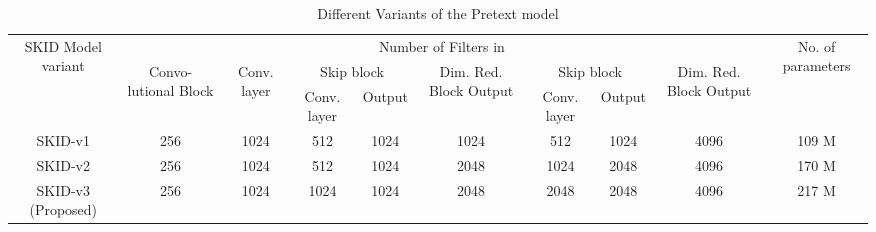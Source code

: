\documentclass[journal]{IEEEtai}
\begin{document}
\begin{table*}[!h]
    \centering
    \bgroup
    \caption{Different Variants of the Pretext model}
    \def\arraystretch{1.5}
    \begin{tabular}{c|c|c|c|c|c|c|c|c|c}
    \hline
       \multirow{4}{1.5cm}{\centering SKID Model variant} &
       \multicolumn{8}{c|}{Number of Filters in} &
       \multirow{4}{1.5cm}{\centering No. of parameters}\\ \cline{2-9}
       
       {} &
       \multirow{3}{*}{\parbox{1.1cm}{\centering Convo- lutional Block}} &
       \multirow{3}{0.8cm}{\centering  Conv. layer} &
       \multicolumn{2}{c|}{\centering  Skip block} &
       \multirow{3}{1.4cm}{\centering  Dim. Red. Block Output} &
       \multicolumn{2}{c|}{ Skip block} &
       \multirow{3}{1.4cm}{\centering  Dim. Red. Block Output} &
       {}\\ \cline{4-5} \cline{7-8}
       
       {} &
       {} &
       {} &
       \multirow{2}{1.4cm}{\centering  Conv. layer} &
       \multirow{2}{0.9cm}{\centering Output} &
       {} &
       \multirow{2}{1.4cm}{\centering  Conv. layer} &
       \multirow{2}{0.9cm}{\centering Output} &
       {} &
       {}\\
       
       {} & {} & {} &  {} & {} & {} & {} & {} & {} & {}\\\hline \hline
        
        SKID-v1 & 256 & 1024 & 512 & 1024 & 1024 & 512 & 1024 & 4096 &  109 M\\  \hline
        SKID-v2 & 256 & 1024 & 512 & 1024 & 2048 & 1024 & 2048 & 4096 &  170 M\\  \hline
        \multirow{2}{2cm}{\centering SKID-v3 (Proposed)} & \multirow{2}{*}{256} & \multirow{2}{*}{1024} & \multirow{2}{*}{1024} & \multirow{2}{*}{1024} & \multirow{2}{*}{2048} & \multirow{2}{*}{2048} & \multirow{2}{*}{2048} & \multirow{2}{*}{4096} & \multirow{2}{*}{ 217 M}\\  
        {} & {} & {} &  {} & {} & {} & {} & {} & {} & {}\\\hline
    \end{tabular}
    \label{tab:pretext_ablation_filters}
    \egroup
   
\end{table*}
\end{document}
